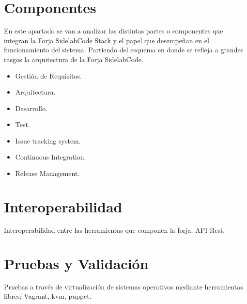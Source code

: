 \section{Componentes}
\label{sec:componentes}

\begin{comment}
Componentes, ¿ aquí se definirían las herramientas a instalar ?

Efectivamente, qué herramientas instala la forja (Se supone que las has descrito en la parte de procesos de desarrollo de forma genérica, aquí se dan nombres concretos). 
\end{comment}

\par En este apartado se van a analizar las distintas partes o componentes que integran la Forja SidelabCode Stack y el papel que desempeñan en el funcionamiento del sistema. Partiendo del esquema en donde se refleja a grandes rasgos la arquitectura de la Forja SidelabCode.

\begin{itemize}
	\item Gesti\'on de Requisitos.
	\item Arquitectura.
	\item Desarrollo.
	\item Test.
	\item Issue tracking system.
	\item Continuous Integration.
	\item Release Management.
\end{itemize}


\section{Interoperabilidad}
\label{sec:interoperabilidad}

\par Interoperabilidad entre las herramientas que componen la forja. API Rest.


\section{Pruebas y Validación}
\label{sec:pruebas-validacion}

\par Pruebas a trav\'es de virtualizaci\'on de sistemas operativos mediante herramientas libres; Vagrant, kvm, puppet.


